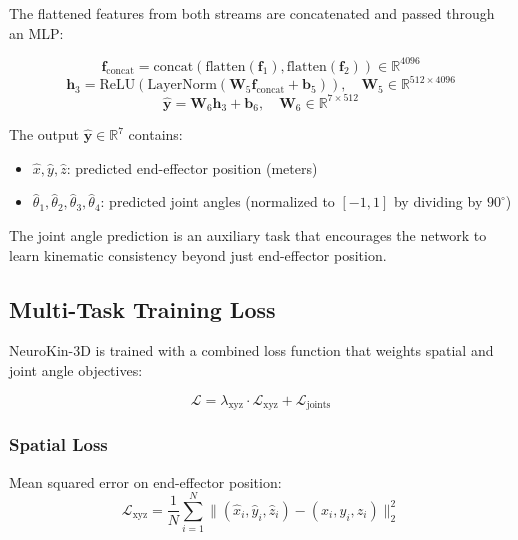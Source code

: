 \documentclass[12pt,a4paper,oneside]{report}
\begin{document}
The flattened features from both streams are concatenated and passed through an MLP:

\begin{equation}
\mathbf{f}_{\text{concat}} = \text{concat}(\text{flatten}(\mathbf{f}_1), \text{flatten}(\mathbf{f}_2)) \in \mathbb{R}^{4096}
\end{equation}
\begin{equation}
\mathbf{h}_3 = \text{ReLU}(\text{LayerNorm}(\mathbf{W}_5 \mathbf{f}_{\text{concat}} + \mathbf{b}_5)), \quad \mathbf{W}_5 \in \mathbb{R}^{512 \times 4096}
\end{equation}
\begin{equation}
\hat{\mathbf{y}} = \mathbf{W}_6 \mathbf{h}_3 + \mathbf{b}_6, \quad \mathbf{W}_6 \in \mathbb{R}^{7 \times 512}
\end{equation}

The output $\hat{\mathbf{y}} \in \mathbb{R}^7$ contains:
\begin{itemize}
    \item $\hat{x}, \hat{y}, \hat{z}$: predicted end-effector position (meters)
    \item $\hat{\theta}_1, \hat{\theta}_2, \hat{\theta}_3, \hat{\theta}_4$: predicted joint angles (normalized to $[-1, 1]$ by dividing by $90^\circ$)
\end{itemize}

The joint angle prediction is an auxiliary task that encourages the network to learn kinematic consistency beyond just end-effector position.

\subsection{Multi-Task Training Loss}
\label{subsec:multi_task_training_loss}

NeuroKin-3D is trained with a combined loss function that weights spatial and joint angle objectives:

\begin{equation}
\mathcal{L} = \lambda_{\text{xyz}} \cdot \mathcal{L}_{\text{xyz}} + \mathcal{L}_{\text{joints}}
\end{equation}

\subsubsection{Spatial Loss}
\label{subsubsec:spatial_loss}

Mean squared error on end-effector position:
\begin{equation}
\mathcal{L}_{\text{xyz}} = \frac{1}{N} \sum_{i=1}^{N} \|(\hat{x}_i, \hat{y}_i, \hat{z}_i) - (x_i, y_i, z_i)\|_2^2
\end{equation}
\end{document}

